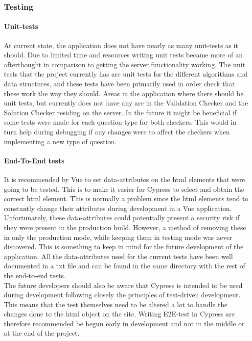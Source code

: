 \subsubsection{Testing}
\paragraph{Unit-tests}
At current state, the application does not have nearly as many unit-tests as it should. Due to limited time and resources writing unit tests became more of an afterthought in comparison to getting the server functionality working. The unit tests that the project currently has are unit tests for the different algorithms and data structures, and these tests have been primarily used in order check that these work the way they should. Areas in the application where there should be unit tests, but currently does not have any are in the Validation Checker and the Solution Checker residing on the server. In the future it might be beneficial if some tests were made for each question type for both checkers. This would in turn help during debugging if any changes were to affect the checkers when implementing a new type of question.
\paragraph{End-To-End tests}
It is recommended by Vue to set data-attributes on the html elements that were going to be tested. This is to make it easier for Cypress to select and obtain the correct html element. This is normally a problem since the html elements tend to constantly change their attributes during development in a Vue application. Unfortunately, these data-attributes could potentially present a security risk if they were present in the production build. However, a method of removing these in only the production mode, while keeping them in testing mode was never discovered. This is something to keep in mind for the future development of the application. All the data-attributes used for the current tests have been well documented in a txt file and can be found in the same directory with the rest of the end-to-end tests.\cite{Cypress:BestPractise}\\[11pt] 
The future developers should also be aware that Cypress is intended to be used during development following closely the principles of test-driven development. This means that the test themselves need to be altered a lot to handle the changes done to the html object on the site. Writing E2E-test in Cypress are therefore recommended be begun early in development and not in the middle or at the end of the project.

